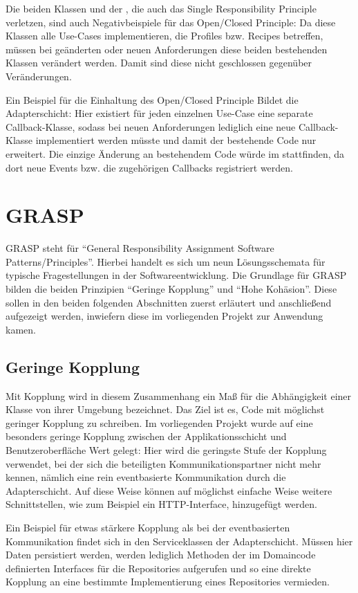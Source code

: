 Die beiden Klassen  und der , die auch das Single Responsibility Principle verletzen, sind auch Negativbeispiele für das Open/Closed Principle: Da diese Klassen alle Use-Cases implementieren, die Profiles bzw. Recipes betreffen, müssen bei geänderten oder neuen Anforderungen diese beiden bestehenden Klassen verändert werden. Damit sind diese nicht geschlossen gegenüber Veränderungen.

Ein Beispiel für die Einhaltung des Open/Closed Principle Bildet die Adapterschicht: Hier existiert für jeden einzelnen Use-Case eine separate Callback-Klasse, sodass bei neuen Anforderungen lediglich eine neue Callback-Klasse implementiert werden müsste und damit der bestehende Code nur erweitert. Die einzige Änderung an bestehendem Code würde im  stattfinden, da dort neue Events bzw. die zugehörigen Callbacks registriert werden.

\section{GRASP}
GRASP steht für \enquote{General Responsibility Assignment Software Patterns/Principles}. Hierbei handelt es sich um neun Lösungsschemata für typische Fragestellungen in der Softwareentwicklung. Die Grundlage für GRASP bilden die beiden Prinzipien \enquote{Geringe Kopplung} und \enquote{Hohe Kohäsion}. Diese sollen in den beiden folgenden Abschnitten zuerst erläutert und anschließend aufgezeigt werden, inwiefern diese im vorliegenden Projekt zur Anwendung kamen.

\subsection{Geringe Kopplung}
Mit Kopplung wird in diesem Zusammenhang ein Maß für die Abhängigkeit einer Klasse von ihrer Umgebung bezeichnet. Das Ziel ist es, Code mit möglichst geringer Kopplung zu schreiben. Im vorliegenden Projekt wurde auf eine besonders geringe Kopplung zwischen der Applikationsschicht und Benutzeroberfläche Wert gelegt: Hier wird die geringste Stufe der Kopplung verwendet, bei der sich die beteiligten Kommunikationspartner nicht mehr kennen, nämlich eine rein eventbasierte Kommunikation durch die Adapterschicht. Auf diese Weise können auf möglichst einfache Weise weitere Schnittstellen, wie zum Beispiel ein HTTP-Interface, hinzugefügt werden.

Ein Beispiel für etwas stärkere Kopplung als bei der eventbasierten Kommunikation findet sich in den Serviceklassen der Adapterschicht. Müssen hier Daten persistiert werden, werden lediglich Methoden der im Domaincode definierten Interfaces für die Repositories aufgerufen und so eine direkte Kopplung an eine bestimmte Implementierung eines Repositories vermieden.

